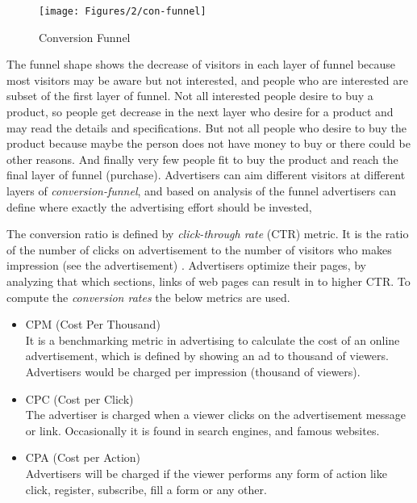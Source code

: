 \begin{figure}[H]
\centering
\texttt{[image: Figures/2/con-funnel]}
\caption{Conversion Funnel}
\label{fig:conversion_funnel}
\end{figure}

The funnel shape shows the decrease of visitors in each layer of funnel because most visitors may be aware but not interested, and people who are interested are subset of the first layer of funnel. Not all interested people desire to buy a product, so people get decrease in the next layer who desire for a product and may read the details and specifications. But not all people who desire to buy the product because maybe the person does not have money to buy or there could be other reasons. And finally very few people fit to buy the product and reach the final layer of funnel (purchase). 
Advertisers can aim different visitors at different layers of \emph{conversion-funnel}, and based on analysis of the funnel advertisers can define where exactly the advertising effort should be invested, \cite{ad_effor_funnel}


The conversion ratio is defined by \emph{click-through rate} (CTR) metric. It is the ratio of the number of clicks on advertisement to the number of visitors who makes impression (see the advertisement) \cite{convfunnel}. Advertisers optimize their pages, by analyzing that which sections, links of web pages can result in to higher CTR. To compute the \emph{ conversion rates } the below metrics are used.


\begin{itemize}
\item CPM (Cost Per Thousand) \\
It is a benchmarking metric in advertising to calculate the cost of an online advertisement, which is defined by showing an ad to thousand of viewers. Advertisers would be charged per impression (thousand of viewers). 

\item CPC (Cost per Click) \\
The advertiser is charged when a viewer clicks on the advertisement message or link. Occasionally it is found in search engines, and famous websites. 

\item CPA (Cost per Action)\\
Advertisers will be charged if the viewer performs any form of action like click, register, subscribe, fill a form or any other.

\end{itemize}



